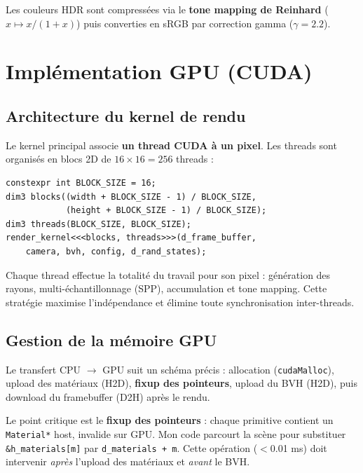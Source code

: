 \documentclass[12pt,a4paper]{article}
\begin{document}
Les couleurs HDR sont compressées via le \textbf{tone mapping de Reinhard} ($x \mapsto x/(1+x)$) puis converties en sRGB par correction gamma ($\gamma = 2.2$).

\section{Implémentation GPU (CUDA)}

\subsection{Architecture du kernel de rendu}

Le kernel principal associe \textbf{un thread CUDA à un pixel}. Les threads sont organisés en blocs 2D de $16 \times 16 = 256$ threads :

\begin{lstlisting}[caption={Lancement du kernel de rendu}]
constexpr int BLOCK_SIZE = 16;
dim3 blocks((width + BLOCK_SIZE - 1) / BLOCK_SIZE,
            (height + BLOCK_SIZE - 1) / BLOCK_SIZE);
dim3 threads(BLOCK_SIZE, BLOCK_SIZE);
render_kernel<<<blocks, threads>>>(d_frame_buffer,
    camera, bvh, config, d_rand_states);
\end{lstlisting}

Chaque thread effectue la totalité du travail pour son pixel : génération des rayons, multi-échantillonnage (SPP), accumulation et tone mapping. Cette stratégie maximise l'indépendance et élimine toute synchronisation inter-threads.

\subsection{Gestion de la mémoire GPU}

Le transfert CPU $\rightarrow$ GPU suit un schéma précis : allocation (\texttt{cudaMalloc}), upload des matériaux (H2D), \textbf{fixup des pointeurs}, upload du BVH (H2D), puis download du framebuffer (D2H) après le rendu.

Le point critique est le \textbf{fixup des pointeurs} : chaque primitive contient un \texttt{Material*} host, invalide sur GPU. Mon code parcourt la scène pour substituer \texttt{\&h\_materials[m]} par \texttt{d\_materials + m}. Cette opération ($<$0.01 ms) doit intervenir \textit{après} l'upload des matériaux et \textit{avant} le BVH.
\end{document}
